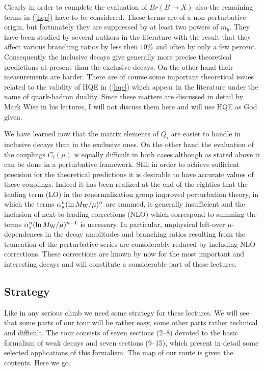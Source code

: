 \documentclass[12pt]{article}
\newcommand{\mw}{M_{\rm W}}
\begin{document}
Clearly in order to complete the evaluation of $Br(B\to X)$ also the 
remaining terms in
(\ref{hqe}) have to be considered. These terms are of a non-perturbative 
origin, but
fortunately they are suppressed by at least two powers of $m_b$. 
They have been
studied by several authors in the literature with the result that they affect
various branching ratios by less then $10\%$ and often by only a few percent.
Consequently the inclusive decays give generally more precise theoretical
predictions at present than the exclusive decays. On the other hand their
measurements are harder. There are of course some important theoretical
issues related to the validity of HQE in (\ref{hqe}) which appear in the 
literature under the name of quark-hadron duality. 
Since these matters are discussed in
detail by Mark Wise in his lectures, I will not discuss them here and will
use HQE as God given.

We have learned now that the matrix elements of $Q_i$ are easier to handle in
inclusive decays than in the exclusive ones. On the other hand the evaluation
of the couplings $C_i(\mu)$ is equally  difficult in both cases although 
as stated
above it can be done in a perturbative framework. Still in order to achieve
sufficient precision for the theoretical predictions it is desirable to have
accurate values of these couplings. Indeed it has been realized at the end of
the eighties
that the leading term (LO) in the renormalization group improved perturbation
theory, in which the terms $\alpha^n_s (\ln\mw/\mu)^n$ are summed, is 
generally insufficient and the
inclusion of next-to-leading corrections  (NLO) which correspond to summing
the terms $\alpha^n_s (\ln\mw/\mu)^{n-1}$ is necessary. 
In particular, unphysical left-over $\mu$-dependences
in the decay amplitudes and branching ratios resulting from the truncation of
the perturbative series are considerably reduced by including NLO
corrections. These corrections are known by now for the most important and
interesting decays and will constitute a considerable part of these lectures. 
\subsection{Strategy}
Like in any serious climb we need some strategy for these lectures. We will
see that some parts of our tour will be rather easy, some other parts rather
technical and difficult. 
The tour consists of seven sections (2--8) devoted to the basic formalism
of weak decays and seven sections (9--15), which present in detail some
selected applications of this formalism.
The map of our route is given the contents. Here we go.
\end{document}
